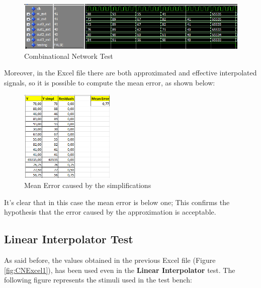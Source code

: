 \begin{figure}[H]
    \centering
    \includegraphics[width=1\textwidth]{img/Chapter4/CI.png}
    \caption{Combinational Network Test}
    \label{fig:CNTest}
\end{figure}

Moreover, in the Excel file there are both approximated and effective interpolated signals, so it is possible to compute the mean error, as shown below:

\begin{figure}[H]
    \centering
    \includegraphics[width=0.4\textwidth]{img/Chapter4/Error.png}
    \caption{Mean Error caused by the simplifications}
    \label{fig:CNExcel2}
\end{figure}

It's clear that in this case the mean error is below one; This confirms the hypothesis that the error caused by the approximation is acceptable.

\subsection{Linear Interpolator Test}

As said before, the values obtained in the previous Excel file (Figure \ref{fig:CNExcel1}), has been used even in the \textbf{Linear Interpolator} test. The following figure represents the stimuli used in the test bench:

